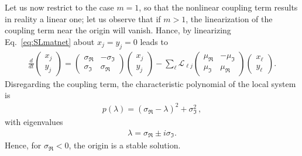 \documentclass[aps,showpacs,preprintnumbers,amsmath,amssymb,twocolumn,superscriptaddress,floatfix,nofootinbib,10pt,pre]{revtex4-1}
\begin{document}
Let us now restrict to the case $m=1$, so that the nonlinear coupling term results in reality a linear one; let us observe that if $m>1$, the linearization of the coupling term near the origin will vanish. Hance, by linearizing Eq.~\eqref{eq:SLmatnet} about $x_j=y_j=0$ leads to 
\begin{align}
\frac{d}{dt}
    \begin{pmatrix}
 {x}_j\\ {y}_j
\end{pmatrix}=\begin{pmatrix}
 \sigma_{\Re} & -\sigma_{\Im}\\
 \sigma_{\Im} & \sigma_{\Re}
\end{pmatrix}\begin{pmatrix}
 x_j\\y_j
\end{pmatrix}-\sum_{\ell}\mathcal{L}_{\ell j}\begin{pmatrix}
 \mu_{\Re} & -\mu_{\Im}\\
 \mu_{\Im} & \mu_{\Re}
\end{pmatrix}
\begin{pmatrix}
 x_\ell\\y_\ell
\end{pmatrix}.
\end{align}
Disregarding the coupling term, the characteristic polynomial of the local system is
\begin{align}
p(\lambda) = (\sigma_{\Re}-\lambda)^2 + \sigma_{\Im}^2\,,
\end{align}
with eigenvalues
\begin{align}
\lambda = \sigma_{\Re} \pm i \sigma_{\Im}.
\end{align}
Hence, for $\sigma_{\Re}<0$, the origin is a stable solution.
\end{document}
